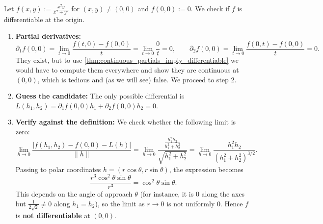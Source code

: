 \begin{example}
\label{ex:differentiability_recipe_application}
Let $f(x,y) := \frac{x^2 y}{x^2+y^2}$ for $(x,y) \neq (0,0)$ and $f(0,0) := 0$. We check if $f$ is differentiable at the origin.
\begin{enumerate}[label=\textbf{\arabic*.}]
  \item \textbf{Partial derivatives:}
    \[\partial_1 f(0,0) = \lim_{t\to 0}\frac{f(t,0)-f(0,0)}{t} = \lim_{t\to 0}\frac{0}{t} = 0, \qquad \partial_2 f(0,0) = \lim_{t\to 0}\frac{f(0,t)-f(0,0)}{t} = 0.\]
    They exist, but to use \cref{thm:continuous_partials_imply_differentiable} we would have to compute them everywhere and show they are continuous at $(0,0)$, which is tedious and (as we will see) false. We proceed to step 2.
  \item \textbf{Guess the candidate:} The only possible differential is $L(h_1,h_2) = \partial_1 f(0,0)h_1 + \partial_2 f(0,0)h_2 = 0$.
  \item \textbf{Verify against the definition:} We check whether the following limit is zero:
    \[\lim_{h\to 0} \frac{|f(h_1,h_2) - f(0,0) - L(h)|}{\lVert h\rVert} = \lim_{h\to 0} \frac{\frac{h_1^2 h_2}{h_1^2+h_2^2}}{\sqrt{h_1^2+h_2^2}} = \lim_{h\to 0} \frac{h_1^2 h_2}{(h_1^2+h_2^2)^{3/2}}.\]
    Passing to polar coordinates $h = (r\cos\theta, r\sin\theta)$, the expression becomes
    \[\frac{r^3\cos^2\theta\sin\theta}{r^3} = \cos^2\theta\sin\theta.\]
    This depends on the angle of approach $\theta$ (for instance, it is $0$ along the axes but $\frac{1}{2\sqrt{2}} \neq 0$ along $h_1=h_2$), so the limit as $r \to 0$ is not uniformly $0$. Hence $f$ is \textbf{not differentiable} at $(0,0)$.
\end{enumerate}
\end{example}

